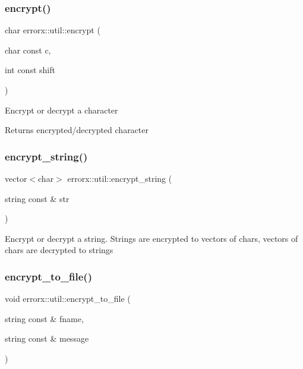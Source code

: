 \subsubsection{\texorpdfstring{encrypt()}{encrypt()}}
{\footnotesize\ttfamily char errorx\+::util\+::encrypt (\begin{DoxyParamCaption}\item[{char const}]{c,  }\item[{int const}]{shift }\end{DoxyParamCaption})}

Encrypt or decrypt a character \begin{DoxyReturn}{Returns}
encrypted/decrypted character 
\end{DoxyReturn}
\mbox{\label{util_8hh_file_ae6e8b32a3527fcc2531f6e9e7d322ee0}} 
\subsubsection{\texorpdfstring{encrypt\+\_\+string()}{encrypt\_string()}}
{\footnotesize\ttfamily vector$<$char$>$ errorx\+::util\+::encrypt\+\_\+string (\begin{DoxyParamCaption}\item[{string const \&}]{str }\end{DoxyParamCaption})}

Encrypt or decrypt a string. Strings are encrypted to vectors of chars, vectors of chars are decrypted to strings \mbox{\label{util_8hh_file_a1dab87be2e50c772e18117ae1f68dc4f}} 
\subsubsection{\texorpdfstring{encrypt\+\_\+to\+\_\+file()}{encrypt\_to\_file()}}
{\footnotesize\ttfamily void errorx\+::util\+::encrypt\+\_\+to\+\_\+file (\begin{DoxyParamCaption}\item[{string const \&}]{fname,  }\item[{string const \&}]{message }\end{DoxyParamCaption})}

